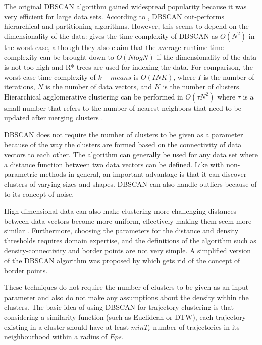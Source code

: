 \documentclass[a4paper, 12pt]{article}
\begin{document}
The original DBSCAN algorithm gained widespread popularity because it was very efficient for large data sets. According to \cite{kotsiantis2004recent}, DBSCAN out-performs hierarchical and partitioning algorithms. However, this seems to depend on the dimensionality of the data: \cite{kriegel2011density} gives the time complexity of DBSCAN as $O(N^2)$ in the worst case, although they also claim that the average runtime time complexity can be brought down to $O(NlogN)$ if the dimensionality of the data is not too high and R*-trees are used for indexing the data. For comparison, the worst case time complexity of $k-means$ is $O(INK)$, where $I$ is the number of iterations, $N$ is the number of data vectors, and $K$ is the number of clusters. Hierarchical agglomerative clustering can be performed in $O(\tau N^2)$ where $\tau$ is a small number that refers to the number of nearest neighbors that need to be updated after merging clusters \citep{franti2006fast}.

DBSCAN does not require the number of clusters to be given as a parameter because of the way the clusters are formed based on the connectivity of data vectors to each other. The algorithm can generally be used for any data set where a distance function between two data vectors can be defined. Like with non-parametric methods in general, an important advantage is that it can discover clusters of varying sizes and shapes. DBSCAN can also handle outliers because of to its concept of noise.

High-dimensional data can also make clustering more challenging distances between data vectors become more uniform, effectively making them seem more similar \citep{ertoz2003finding}. Furthermore, choosing the parameters for the distance and density thresholds requires domain expertise, and the definitions of the algorithm such as density-connectivity and border points are not very simple. A simplified version of the DBSCAN algorithm was proposed by \cite{campello2013density} which gets rid of the concept of border points.

These techniques do not require the number of clusters to be given as an input parameter and also do not make any assumptions about the density within the clusters. The basic idea of using DBSCAN for trajectory clustering is that considering a similarity function (such as Euclidean or DTW), each trajectory existing in a cluster should have at least $min T_{r}$ number of trajectories in its neighbourhood within a radius of $Eps$.
\end{document}
